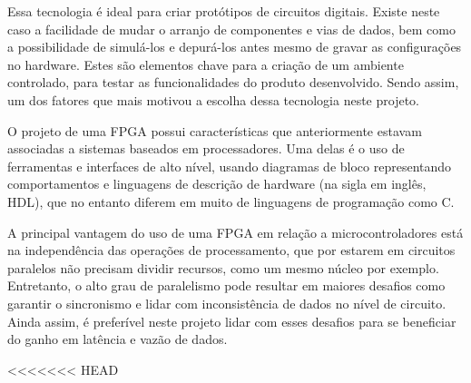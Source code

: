 \begin{table}[h!]
	Essa tecnologia é ideal para criar protótipos de circuitos digitais. Existe neste caso a facilidade de mudar o arranjo de componentes e vias de dados, bem como a possibilidade de simulá-los e depurá-los antes mesmo de gravar as configurações no hardware. Estes são elementos chave para a criação de um ambiente controlado, para testar as funcionalidades do produto desenvolvido. Sendo assim, um dos fatores que mais motivou a escolha dessa tecnologia neste projeto.
	
	O projeto de uma FPGA possui características que anteriormente estavam associadas a sistemas baseados em processadores. Uma delas é o uso de ferramentas e interfaces de alto nível, usando diagramas de bloco representando comportamentos e linguagens de descrição de hardware (na sigla em inglês, HDL), que no entanto diferem em muito de linguagens de programação como C. 
	
	A principal vantagem do uso de uma FPGA em relação a microcontroladores está na independência das operações de processamento, que por estarem em circuitos paralelos não precisam dividir recursos, como um mesmo núcleo por exemplo. Entretanto, o alto grau de paralelismo pode resultar em maiores desafios como garantir o sincronismo e lidar com inconsistência de dados no nível de circuito. Ainda assim, é preferível neste projeto lidar com esses desafios para se beneficiar do ganho em latência e vazão de dados.
	
<<<<<<< HEAD
	
	

\end{table}
